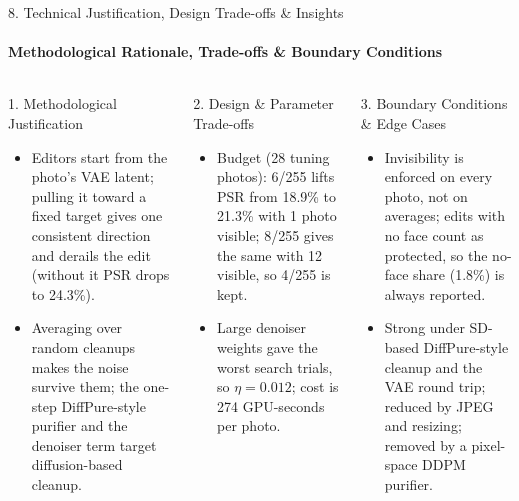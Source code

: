 \documentclass[aspectratio=169, 11pt]{beamer}
\begin{document}
\begin{frame}{8. Technical Justification, Design Trade-offs \& Insights}
    \framesubtitle{Methodological Rationale, Trade-offs \& Boundary Conditions}
    \begin{columns}[T]
        \begin{block}{1. Methodological Justification}
            \scriptsize
            \begin{itemize}
                \item Editors start from the photo's VAE latent; pulling it toward a fixed target gives one consistent direction and derails the edit (without it PSR drops to 24.3\%).
                \item Averaging over random cleanups makes the noise survive them; the one-step DiffPure-style purifier and the denoiser term target diffusion-based cleanup.
            \end{itemize}
        \end{block}

        \begin{block}{2. Design \& Parameter Trade-offs}
            \scriptsize
            \begin{itemize}
                \item Budget (28 tuning photos): 6/255 lifts PSR from 18.9\% to 21.3\% with 1 photo visible; 8/255 gives the same with 12 visible, so 4/255 is kept.
                \item Large denoiser weights gave the worst search trials, so $\eta=0.012$; cost is 274 GPU-seconds per photo.
            \end{itemize}
        \end{block}

        \begin{block}{3. Boundary Conditions \& Edge Cases}
            \scriptsize
            \begin{itemize}
                \item Invisibility is enforced on every photo, not on averages; edits with no face count as protected, so the no-face share (1.8\%) is always reported.
                \item Strong under SD-based DiffPure-style cleanup and the VAE round trip; reduced by JPEG and resizing; removed by a pixel-space DDPM purifier.
            \end{itemize}
        \end{block}


\end{columns}
\end{frame}
\end{document}
